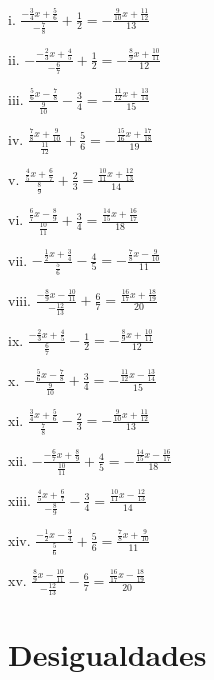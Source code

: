 \documentclass[]{book}
\begin{document}
\begin{multicols}{2}
    i. $\frac{-\frac{3}{4}x+\frac{5}{6}}{-\frac{7}{8}}+\frac{1}{2}=-\frac{\frac{9}{10}x+\frac{11}{12}}{13}$

    ii. $-\frac{-\frac{2}{3}x+\frac{4}{5}}{-\frac{6}{7}}+\frac{1}{2}=-\frac{\frac{8}{9}x+\frac{10}{11}}{12}$

    iii. $\frac{\frac{5}{6}x-\frac{7}{8}}{\frac{9}{10}}-\frac{3}{4}=-\frac{\frac{11}{12}x+\frac{13}{14}}{15}$

    iv. $\frac{\frac{7}{8}x+\frac{9}{10}}{\frac{11}{12}}+\frac{5}{6}=-\frac{\frac{15}{16}x+\frac{17}{18}}{19}$

    v. $\frac{\frac{4}{5}x+\frac{6}{7}}{\frac{8}{9}}+\frac{2}{3}=\frac{\frac{10}{11}x+\frac{12}{13}}{14}$

    vi. $\frac{\frac{6}{7}x-\frac{8}{9}}{\frac{10}{11}}+\frac{3}{4}=\frac{\frac{14}{15}x+\frac{16}{17}}{18}$

    vii. $-\frac{\frac{1}{2}x+\frac{3}{4}}{\frac{5}{6}}-\frac{4}{5}=-\frac{\frac{7}{8}x-\frac{9}{10}}{11}$

    viii. $\frac{-\frac{8}{9}x-\frac{10}{11}}{-\frac{12}{13}}+\frac{6}{7}=\frac{\frac{16}{17}x+\frac{18}{19}}{20}$

    ix. $\frac{-\frac{2}{3}x+\frac{4}{5}}{\frac{6}{7}}-\frac{1}{2}=-\frac{\frac{8}{9}x+\frac{10}{11}}{12}$

    x. $-\frac{\frac{5}{6}x-\frac{7}{8}}{\frac{9}{10}}+\frac{3}{4}=-\frac{\frac{11}{12}x-\frac{13}{14}}{15}$

    xi. $\frac{\frac{3}{4}x+\frac{5}{6}}{\frac{7}{8}}-\frac{2}{3}=-\frac{\frac{9}{10}x+\frac{11}{12}}{13}$

    xii. $-\frac{-\frac{6}{7}x+\frac{8}{9}}{\frac{10}{11}}+\frac{4}{5}=-\frac{\frac{14}{15}x-\frac{16}{17}}{18}$

    xiii. $\frac{\frac{4}{5}x+\frac{6}{7}}{-\frac{8}{9}}-\frac{3}{4}=\frac{\frac{10}{11}x-\frac{12}{13}}{14}$

    xiv. $\frac{-\frac{1}{2}x-\frac{3}{4}}{\frac{5}{6}}+\frac{5}{6}=\frac{\frac{7}{8}x+\frac{9}{10}}{11}$

    xv. $\frac{\frac{8}{9}x-\frac{10}{11}}{-\frac{12}{13}}-\frac{6}{7}=\frac{\frac{16}{17}x-\frac{18}{19}}{20}$
\end{multicols}

\chapter{Desigualdades}\label{desigualdades}
\end{document}
